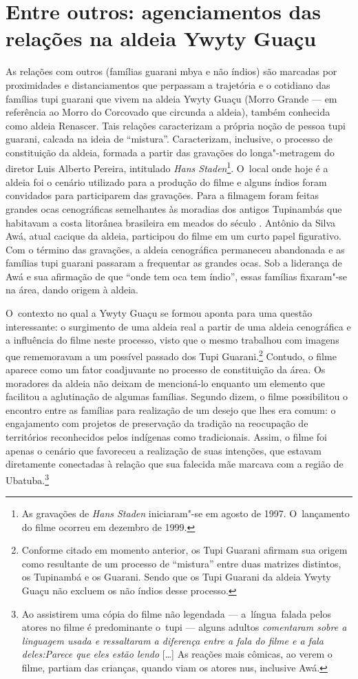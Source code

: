 \section{Entre outros: agenciamentos das relações na aldeia Ywyty Guaçu} 

As relações com outros (famílias guarani mbya e não índios) são marcadas
por proximidades e distanciamentos que perpassam a trajetória e o
cotidiano das famílias tupi guarani que vivem na aldeia Ywyty Guaçu
(Morro Grande --- em referência ao Morro do Corcovado que circunda a
aldeia), também conhecida como aldeia Renascer. Tais relações
caracterizam a própria noção de pessoa tupi guarani, calcada na ideia
de ``mistura''. Caracterizam, inclusive, o processo de constituição da
aldeia, formada a partir das gravações do longa"-metragem do diretor
Luis Alberto Pereira, intitulado \emph{Hans Staden}\footnote{As gravações de
\emph{Hans Staden} iniciaram"-se em agosto de 1997. O~lançamento do filme
ocorreu em dezembro de 1999.}. O~local onde hoje é a aldeia foi o
cenário utilizado para a produção do filme e alguns índios foram
convidados para participarem das gravações. Para a filmagem foram
feitas grandes ocas cenográficas semelhantes às moradias dos antigos
Tupinambás que habitavam a costa litorânea brasileira em meados do
século . Antônio da Silva Awá, atual cacique da aldeia, participou
do filme em um curto papel figurativo. Com o término das gravações, a
aldeia cenográfica permaneceu abandonada e as famílias tupi guarani
passaram a frequentar as grandes ocas. Sob a liderança de Awá e sua
afirmação de que ``onde tem oca tem índio'', essas famílias fixaram"-se na
área, dando origem à aldeia.

O~contexto no qual a Ywyty Guaçu se formou aponta para uma questão
interessante: o surgimento de uma aldeia real a partir de uma aldeia
cenográfica e a influência do filme neste processo, visto que o mesmo
trabalhou com imagens que rememoravam a um possível passado dos Tupi
Guarani.\footnote{Conforme citado em momento anterior, os Tupi Guarani
afirmam sua origem como resultante de um processo de ``mistura'' entre duas
matrizes distintos, os Tupinambá e os Guarani. Sendo que os Tupi
Guarani da aldeia Ywyty Guaçu não excluem os não índios desse
processo.} Contudo, o filme aparece como um fator coadjuvante no
processo de constituição da área. Os moradores da aldeia não deixam de
mencioná-lo enquanto um elemento que facilitou a aglutinação de algumas
famílias. Segundo dizem, o filme possibilitou o encontro entre as
famílias para realização de um desejo que lhes era comum: o engajamento
com projetos de preservação da tradição na reocupação de territórios
reconhecidos pelos indígenas como tradicionais. Assim, o filme foi
apenas o cenário que favoreceu a realização de suas intenções, que
estavam diretamente conectadas à relação que sua falecida mãe marcava
com a região de Ubatuba.\footnote{Ao assistirem uma cópia do filme não
legendada --- a~língua~falada pelos atores no filme é predominante o~tupi
--- alguns adultos \emph{comentaram sobre a linguagem usada e ressaltaram
a diferença entre a fala do filme e a fala deles:}\emph{Parece que
eles estão lendo} [\ldots{}] As reações mais cômicas, ao verem o filme, partiam
das crianças, quando viam os atores nus, inclusive Awá.}

